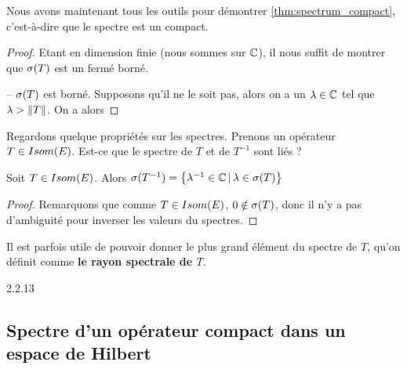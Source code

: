 Nous avons maintenant tous les outils pour démontrer
\ref{thm:spectrum_compact}, c'est-à-dire que le spectre est un compact.

\begin{proof}
	Etant en dimension finie (nous sommes sur $\mathbb{C}$), il nous suffit de
	montrer que $\sigma(T)$ est un fermé borné.

	-- $\sigma(T)$ est borné. Supposons qu'il ne le soit pas, alors on a un
	$\lambda \in \mathbb{C}$ tel que $\lambda > \norm{T}$. On a alors
\end{proof}


Regardons quelque propriétés sur les spectres. Prenons un opérateur $T \in
Isom(E)$. Est-ce que le spectre de $T$ et de $T^{-1}$ sont liés ?

\begin{proposition}
	Soit $T \in Isom(E)$. Alors $\sigma(T^{-1}) =
	\left\{\lambda^{-1} \in \mathbb{C} \, | \, \lambda \in \sigma(T) \right\}$
\end{proposition}

\begin{proof}
	Remarquons que comme $T \in Isom(E)$, $0 \notin \sigma(T)$,
	donc il n'y a pas d'ambiguité pour inverser les valeurs du spectres.
\end{proof}

Il est parfois utile de pouvoir donner le plus grand élément du spectre de $T$, qu'on
définit comme \textbf{le rayon spectrale de $T$}.

\begin{proposition}
	2.2.13
\end{proposition}



\subsection{Spectre d'un opérateur compact dans un espace de Hilbert}
